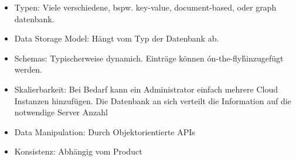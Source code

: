 

\begin{itemize}
\item Typen: Viele verschiedene, bspw. key-value, document-based, oder graph datenbank.
\item Data Storage Model: Hängt vom Typ der Datenbank ab.
\item Schemas: Typischerweise dynamich. Einträge können \'on-the-fly\' hinzugefügt werden.
\item Skalierbarkeit: Bei Bedarf kann ein Administrator einfach mehrere Cloud Instanzen hinzufügen. Die Datenbank an sich verteilt die Information auf die notwendige Server Anzahl
\item Data Manipulation: Durch Objektorientierte APIs
\item Konsistenz: Abhängig vom Product
\end{itemize}

